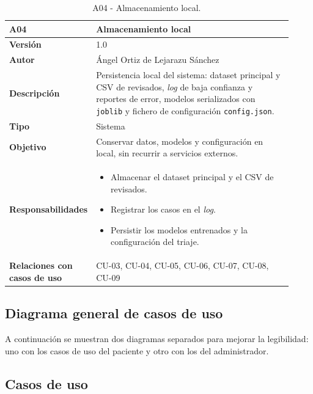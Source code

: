 \begin{table}[H]
	\centering
	\begin{tabular}{ p{0.21\linewidth} p{0.71\linewidth} }
		\toprule
		\textbf{A04}    & \textbf{Almacenamiento local}\\
		\toprule
		\textbf{Versión}         & 1.0 \\
		\textbf{Autor}           & Ángel Ortiz de Lejarazu Sánchez \\
		\textbf{Descripción}     & Persistencia local del sistema: dataset principal y CSV de revisados, \textit{log} de baja confianza y reportes de error, modelos serializados con \texttt{joblib} y fichero de configuración \texttt{config.json}. \\
		\textbf{Tipo}            & Sistema \\
		\textbf{Objetivo}        & Conservar datos, modelos y configuración en local, sin recurrir a servicios externos. \\
		\textbf{Responsabilidades} &
		\begin{itemize}
			\item Almacenar el dataset principal y el CSV de revisados.
			\item Registrar los casos en el \textit{log}.
			\item Persistir los modelos entrenados y la configuración del triaje.
		\end{itemize} \\
		\textbf{Relaciones con casos de uso} & CU-03, CU-04, CU-05, CU-06, CU-07, CU-08, CU-09 \\
		\bottomrule
	\end{tabular}
	\caption{A04 - Almacenamiento local.}
\end{table}

\subsection*{Diagrama general de casos de uso}

A continuación se muestran dos diagramas separados para mejorar la legibilidad: uno con los casos de uso del paciente y otro con los del administrador.



\subsection*{Casos de uso}

